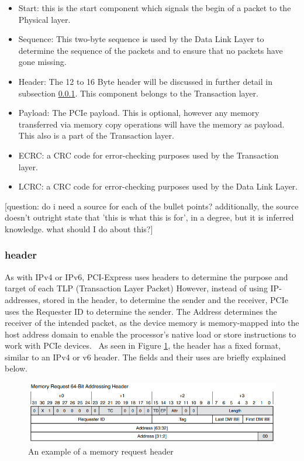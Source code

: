 \begin{itemize}
\item Start: this is the start component which signals the begin of a packet to the Physical layer.
\item Sequence: This two-byte sequence is used by the Data Link Layer to determine the sequence of the packets and to ensure that no packets have gone missing.
\item Header: The 12 to 16 Byte header will be discussed in further detail in subsection \ref{sec:header}. This component belongs to the Transaction layer. 
\item Payload: The PCIe payload. This is optional, however any memory transferred via memory copy operations will have the memory as payload. This also is a part of the Transaction layer.
\item ECRC: a CRC code for error-checking purposes used by the Transaction layer.
\item LCRC: a CRC code for error-checking purposes used by the Data Link Layer.
\end{itemize}

[question: do i need a source for each of the bullet points? additionally, the source doesn't outright state that 'this is what this is for', in a degree, but it is inferred knowledge. what should I do about this?]

\subsubsection{header}
\label{sec:header}
As with IPv4 or IPv6, PCI-Express uses headers to determine the purpose and target of each TLP (Transaction Layer Packet)
However, instead of using IP-addresses, stored in the header, to determine the sender and the receiver, PCIe uses the Requester ID to determine the sender. The Address determines the receiver of the intended packet, as the device memory is memory-mapped into the host address domain to enable the processor's native load or store instructions to work with PCIe devices.~\parencite{oracle_inc_pci_nodate} As seen in Figure \ref{fig:header}, the header has a fixed format, similar to an IPv4 or v6 header. The fields and their uses are briefly explained below.

\begin{figure}
\includegraphics[width = \linewidth]{figures/PCIE-header}
\caption{An example of a memory request header ~\parencite{lawley_understanding_2014}}
\label{fig:header}
\end{figure}

